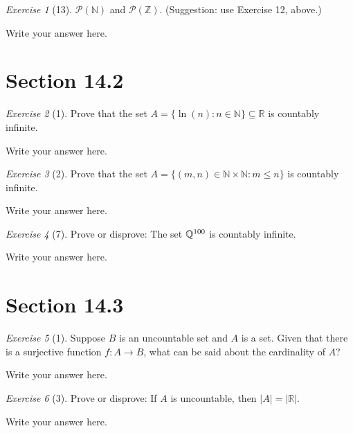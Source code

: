 \documentclass[12pt]{amsart}
\makeatletter
\theoremstyle{remark}
\newtheorem*{exercise}{Exercise}%
\def\RR{\ensuremath{\mathbb R}}
\def\NN{\ensuremath{\mathbb N}}
\def\ZZ{\ensuremath{\mathbb Z}}
\def\QQ{{\ensuremath\mathbb Q}}
\newcommand{\mc}[1]{\ensuremath{\mathcal{#1}}} %
\renewenvironment{proof}[1][\proofname]{\par\doublespacing
  \pushQED{\qed}%
  \normalfont \topsep6\p@\@plus6\p@\relax
  \list{}{%
    \settowidth{\leftmargin}{\itshape\proofname:\hskip\labelsep}%
    \setlength{\labelwidth}{0pt}%
    \setlength{\itemindent}{-\leftmargin}%
  }%
  \item[\hskip\labelsep\itshape#1\@addpunct{:}]\ignorespaces
}{%
  \popQED\endlist\@endpefalse
  \singlespacing
}
\theoremstyle{mycomment}
\makeatother
\begin{document}
\begin{exercise}[13] $\mc P(\NN)$ and $\mc P(\ZZ)$. (Suggestion: use Exercise 12, above.)
\begin{proof}
Write your answer here.
\end{proof}
\end{exercise}

\section*{Section 14.2}
\begin{exercise}[1] Prove that the set $A=\{\ln(n):n\in \NN\}\subseteq \RR$ is countably infinite.
\begin{proof}
Write your answer here.
\end{proof}
\end{exercise}

\begin{exercise}[2] Prove that the set $A=\{(m,n)\in\NN\times\NN:m\le n\}$ is countably infinite.
\begin{proof}
Write your answer here.
\end{proof}
\end{exercise}

\begin{exercise}[7] Prove or disprove: The set $\QQ^{100}$ is countably infinite.
\begin{proof}
Write your answer here.
\end{proof}
\end{exercise}

\section*{Section 14.3}
\begin{exercise}[1] Suppose $B$ is an uncountable set and $A$ is a set. Given that there is a surjective function $f:A\to B$, what can be said about the cardinality of $A$?
\begin{proof}[Solution]
Write your answer here.
\end{proof}
\end{exercise}


\begin{exercise}[3] Prove or disprove: If $A$ is uncountable, then $|A|=|\RR|$.
\begin{proof}
Write your answer here.
\end{proof}
\end{exercise}
\end{document}
